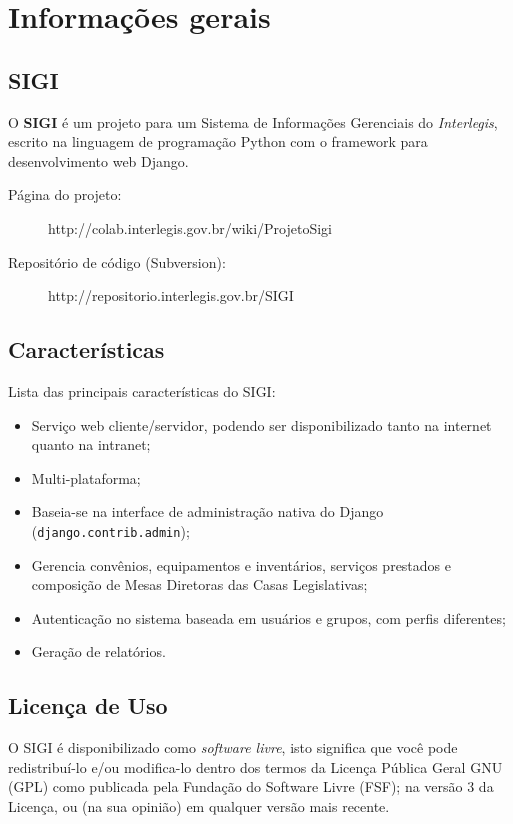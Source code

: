 %
%

\section{Informações gerais}
\label{sec:info}

\subsection{SIGI}

O \textbf{SIGI} é um projeto para um Sistema de Informações Gerenciais
do \emph{Interlegis}, escrito na linguagem de programação Python com o
framework para desenvolvimento web Django.

\begin{description}
\item[Página do projeto:]
  http://colab.interlegis.gov.br/wiki/ProjetoSigi
\item[Repositório de código (Subversion):]
  http://repositorio.interlegis.gov.br/SIGI
\end{description}


\subsection{Características}
Lista das principais características do SIGI:

\begin{itemize}
\item Serviço web cliente/servidor, podendo ser disponibilizado tanto
  na internet quanto na intranet;
  
\item Multi-plataforma;
  
\item Baseia-se na interface de administração nativa do Django\\
  (\verb|django.contrib.admin|);
  
\item Gerencia convênios, equipamentos e inventários, serviços
  prestados e composição de Mesas Diretoras das Casas Legislativas;

\item Autenticação no sistema baseada em usuários e grupos, com perfis
  diferentes;

\item Geração de relatórios.
\end{itemize}

\subsection{Licença de Uso}
O SIGI é disponibilizado como \emph{software livre}, isto significa
que você pode redistribuí-lo e/ou modifica-lo dentro dos termos da
Licença Pública Geral GNU (GPL) como publicada pela Fundação do
Software Livre (FSF); na versão 3 da Licença, ou (na sua opinião) em
qualquer versão mais recente.

%
%
